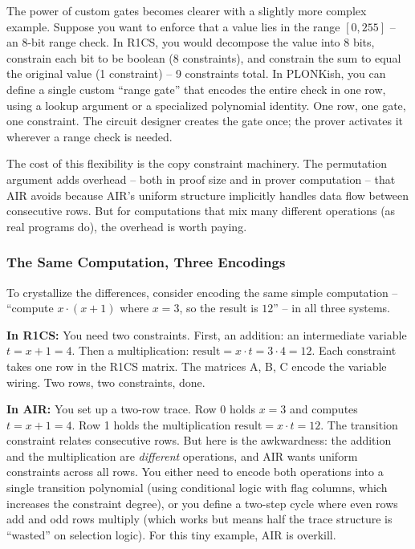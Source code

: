 \documentclass[
  11pt,
  openany]{report}
\renewcommand{\textbf}[1]{{\bfseries\color{MidnightBold}#1}}
\begin{document}
The power of custom gates becomes clearer with a slightly more complex example.
Suppose you want to enforce that a value lies in the range \([0, 255]\) -- an
8-bit range check. In R1CS, you would decompose the value into 8 bits, constrain
each bit to be boolean (8 constraints), and constrain the sum to equal the
original value (1 constraint) -- 9 constraints total. In PLONKish, you can
define a single custom ``range gate'' that encodes the entire check in one row,
using a lookup argument or a specialized polynomial identity. One row, one gate,
one constraint. The circuit designer creates the gate once; the prover activates
it wherever a range check is needed.

The cost of this flexibility is the copy constraint machinery. The permutation
argument adds overhead -- both in proof size and in prover computation -- that
AIR avoids because AIR's uniform structure implicitly handles data flow between
consecutive rows. But for computations that mix many different operations (as
real programs do), the overhead is worth paying.

\subsubsection{The Same Computation, Three
Encodings}\label{the-same-computation-three-encodings}

To crystallize the differences, consider encoding the same simple computation --
``compute \(x \cdot (x + 1)\) where \(x = 3\), so the result is \(12\)'' -- in
all three systems.

\textbf{In R1CS:} You need two constraints. First, an addition: an intermediate
variable \(t = x + 1 = 4\). Then a multiplication:
\(\text{result} = x \cdot t = 3 \cdot 4 = 12\). Each constraint takes one row in
the R1CS matrix. The matrices A, B, C encode the variable wiring. Two rows, two
constraints, done.

\textbf{In AIR:} You set up a two-row trace. Row 0 holds \(x = 3\) and computes
\(t = x + 1 = 4\). Row 1 holds the multiplication
\(\text{result} = x \cdot t = 12\). The transition constraint relates
consecutive rows. But here is the awkwardness: the addition and the
multiplication are \emph{different} operations, and AIR wants uniform
constraints across all rows. You either need to encode both operations into a
single transition polynomial (using conditional logic with flag columns, which
increases the constraint degree), or you define a two-step cycle where even rows
add and odd rows multiply (which works but means half the trace structure is
``wasted'' on selection logic). For this tiny example, AIR is overkill.
\end{document}
